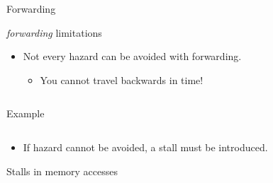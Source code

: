 \begin{frame}[t]{Forwarding}
\makebox[\textwidth][c]{

}
\end{frame}

\begin{frame}[t,fragile]{\emph{forwarding} limitations}
\begin{itemize}
  \item Not every hazard can be avoided with forwarding.
    \begin{itemize}
      \item You cannot travel backwards in time!
    \end{itemize}
\end{itemize}

\begin{columns}

\begin{column}{.4\textwidth}
\begin{block}{Example}

\end{block}
\end{column}

\begin{column}{.6\textwidth}
\makebox[\textwidth][c]{

}
\end{column}

\end{columns}
\begin{itemize}
  \item If hazard cannot be avoided, a stall must be introduced.
\end{itemize}

\end{frame}

\begin{frame}[t]{Stalls in memory accesses}
\makebox[\textwidth][c]{

}
\end{frame}
